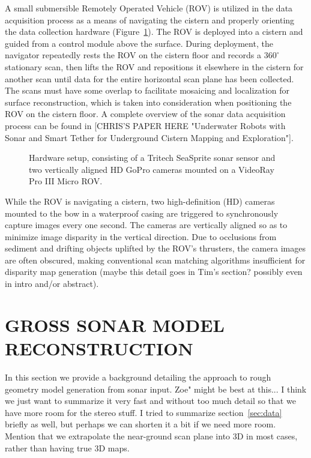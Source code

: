 \documentclass[a4paper,twoside]{article}
\begin{document}
\noindent A small submersible Remotely Operated Vehicle (ROV) is utilized in the data acquisition process as a means of navigating the cistern and properly orienting the data collection hardware (Figure~\ref{fig:ROV}). The ROV is deployed into a cistern and guided from a control module above the surface. During deployment, the navigator repeatedly rests the ROV on the cistern floor and records a $360^{\circ}$ stationary scan, then lifts the ROV and repositions it elsewhere in the cistern for another scan until data for the entire horizontal scan plane has been collected. The scans must have some overlap to facilitate mosaicing and localization for surface reconstruction, which is taken into consideration when positioning the ROV on the cistern floor. A complete overview of the sonar data acquisition process can be found in [CHRIS'S PAPER HERE "Underwater Robots with Sonar and Smart Tether for Underground Cistern Mapping and Exploration"].
\begin{figure}[!h]
   \vspace{-0.2cm}
   \caption{Hardware setup, consisting of a Tritech SeaSprite sonar sensor and two vertically aligned HD GoPro cameras mounted on a VideoRay Pro III Micro ROV.}
  \label{fig:ROV}
 \end{figure}

While the ROV is navigating a cistern, two high-definition (HD) cameras mounted to the bow in a waterproof casing are triggered to synchronously capture images every one second. The cameras are vertically aligned so as to minimize image disparity in the vertical direction. Due to occlusions from sediment and drifting objects uplifted by the ROV's thrusters, the camera images are often obscured, making conventional scan matching algorithms insufficient for disparity map generation (maybe this detail goes in Tim's section? possibly even in intro and/or abstract).

\section{\uppercase{Gross sonar Model Reconstruction}}
\label{sec:reconstruction}


\noindent In this section we provide a background detailing the approach to rough geometry model generation from sonar input. Zoe" might be best at this... I think we just want to summarize it very fast and without too much detail so that we have more room for the stereo stuff. I tried to summarize section~\ref{sec:data} briefly as well, but perhaps we can shorten it a bit if we need more room. Mention that we extrapolate the near-ground scan plane into 3D in most cases, rather than having true 3D maps.
\end{document}
